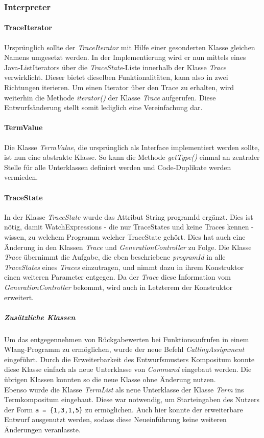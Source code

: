 \documentclass[parskip=full]{scrartcl}
\begin{document}
\subsubsection{Interpreter}
\paragraph{TraceIterator}
Ursprünglich sollte der \textit{TraceIterator} mit Hilfe einer gesonderten Klasse gleichen Namens umgesetzt werden. In der Implementierung wird er nun mittels eines Java-ListIterators über die \textit{TraceState}-Liste innerhalb der Klasse \textit{Trace} verwirklicht. Dieser bietet dieselben Funktionalitäten, kann also in zwei Richtungen iterieren. Um einen Iterator über den Trace zu erhalten, wird weiterhin die Methode \textit{iterator()} der Klasse \textit{Trace} aufgerufen. Diese Entwurfsänderung stellt somit lediglich eine Vereinfachung dar.
\paragraph{TermValue}
Die Klasse \textit{TermValue}, die ursprünglich als Interface implementiert werden sollte, ist nun eine abstrakte Klasse. So kann die Methode \textit{getType()} einmal an zentraler Stelle für alle Unterklassen definiert werden und Code-Duplikate werden vermieden.
\paragraph{TraceState}
In der Klasse \textit{TraceState} wurde das Attribut String programId ergänzt. Dies ist nötig, damit WatchExpressions - die nur TraceStates und keine Traces kennen - wissen, zu welchem Programm welcher TraceState gehört. Dies hat auch eine Änderung in den Klassen \textit{Trace} und \textit{GenerationController} zu Folge. Die Klasse \textit{Trace} übernimmt die Aufgabe, die eben beschriebene \textit{programId} in alle \textit{TraceStates} eines \textit{Traces} einzutragen, und nimmt dazu in ihrem Konstruktor einen weiteren Parameter entgegen. Da der \textit{Trace} diese Information vom  \textit{GenerationController} bekommt, wird auch in Letzterem der Konstruktor erweitert.
\subparagraph{Zusätzliche Klassen}
Um das entgegennehmen von Rückgabewerten bei Funktionsaufrufen in einem Wlang-Programm zu ermöglichen, wurde der neue Befehl \textit{CallingAssignment} eingeführt. Durch die Erweiterbarkeit des Entwurfsmusters Kompositum konnte diese Klasse einfach als neue Unterklasse von \textit{Command} eingebaut werden. Die übrigen Klassen konnten so die neue Klasse ohne Änderung nutzen.\\
Ebenso wurde die Klasse \textit{TermList} als neue Unterklasse der Klasse \textit{Term} ins Termkompositum eingebaut. Diese war notwendig, um Starteingaben des Nutzers der Form \texttt{a = \{1,3,1,5\}} zu ermöglichen. Auch hier konnte der erweiterbare Entwurf ausgenutzt werden, sodass diese Neueinführung keine weiteren Änderungen veranlasste.
\end{document}
